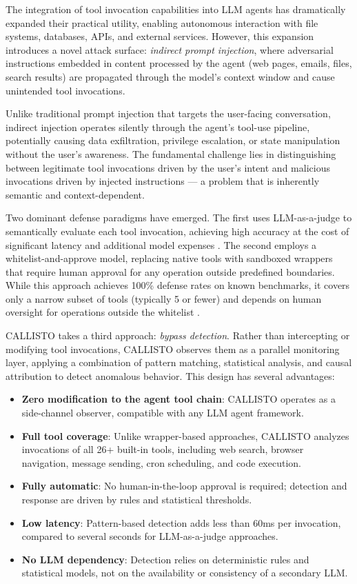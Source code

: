 \documentclass[10pt,conference]{IEEEtran}
\begin{document}
The integration of tool invocation capabilities into LLM agents has dramatically expanded their practical utility, enabling autonomous interaction with file systems, databases, APIs, and external services. However, this expansion introduces a novel attack surface: \textit{indirect prompt injection}, where adversarial instructions embedded in content processed by the agent (web pages, emails, files, search results) are propagated through the model's context window and cause unintended tool invocations.

Unlike traditional prompt injection that targets the user-facing conversation, indirect injection operates silently through the agent's tool-use pipeline, potentially causing data exfiltration, privilege escalation, or state manipulation without the user's awareness. The fundamental challenge lies in distinguishing between legitimate tool invocations driven by the user's intent and malicious invocations driven by injected instructions — a problem that is inherently semantic and context-dependent.

Two dominant defense paradigms have emerged. The first uses LLM-as-a-judge to semantically evaluate each tool invocation, achieving high accuracy at the cost of significant latency and additional model expenses \cite{clawguard}. The second employs a whitelist-and-approve model, replacing native tools with sandboxed wrappers that require human approval for any operation outside predefined boundaries. While this approach achieves 100\% defense rates on known benchmarks, it covers only a narrow subset of tools (typically 5 or fewer) and depends on human oversight for operations outside the whitelist \cite{clawguard}.

CALLISTO takes a third approach: \textit{bypass detection}. Rather than intercepting or modifying tool invocations, CALLISTO observes them as a parallel monitoring layer, applying a combination of pattern matching, statistical analysis, and causal attribution to detect anomalous behavior. This design has several advantages:

\begin{itemize}
    \item \textbf{Zero modification to the agent tool chain}: CALLISTO operates as a side-channel observer, compatible with any LLM agent framework.
    \item \textbf{Full tool coverage}: Unlike wrapper-based approaches, CALLISTO analyzes invocations of all 26+ built-in tools, including web search, browser navigation, message sending, cron scheduling, and code execution.
    \item \textbf{Fully automatic}: No human-in-the-loop approval is required; detection and response are driven by rules and statistical thresholds.
    \item \textbf{Low latency}: Pattern-based detection adds less than 60ms per invocation, compared to several seconds for LLM-as-a-judge approaches.
    \item \textbf{No LLM dependency}: Detection relies on deterministic rules and statistical models, not on the availability or consistency of a secondary LLM.
\end{itemize}
\end{document}
